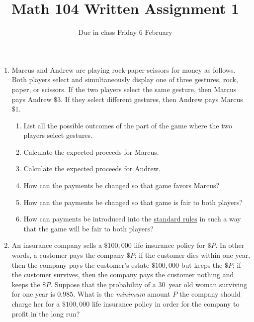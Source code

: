 \documentclass[12pt]{article}
\author{}\date{Due in class Friday 6 February}
\title{Math 104 Written Assignment 1}\author{}
\begin{document}
\maketitle
\pagestyle{empty}
\begin{enumerate}
\item Marcus and Andrew are playing rock-paper-scissors
for money as follows. Both players select and simultaneously display
one of three gestures, rock, paper, or scissors.
If the two players select the same gesture, then Marcus pays Andrew 
$\$3$. If they select different gestures, then Andrew pays Marcus $\$1$.
\begin{enumerate}
\item List all the possible outcomes of the part of the game
where the two players select gestures.
\vspace{.5in}
\item Calculate the expected proceeds for Marcus.
\vspace{.5in}
\item Calculate the expected proceeds for Andrew.
\vspace{.5in}
\item How can the payments be changed so that game favors Marcus?
\vspace{.5in}
\item How can the payments be changed so that game is fair to both
players?
\vspace{.5in}
\item How can payments be introduced into the
\href{http://en.wikipedia.org/wiki/Rock-paper-scissors}{standard rules}
in such a way that the game will be fair to both players?
\end{enumerate}

\item An insurance company sells a $\$100,000$
life insurance policy for $\$P$. 
In other words, a customer pays the company $\$P$;
if the customer dies within one year, then the company
pays the customer's estate $\$100,000$ but keeps the $\$P$;
if the customer survives, then
the company pays the customer nothing and keeps the $\$P$. 
Suppose that the probability of a $30$~year old woman surviving
for one year is $0.985$.
What is the {\em minimum} amount $P$ the
company should charge her for a  $\$100,000$ life
insurance policy in order
for the company to profit in the long run?
\vspace{3in}
\end{enumerate}
\end{document}
